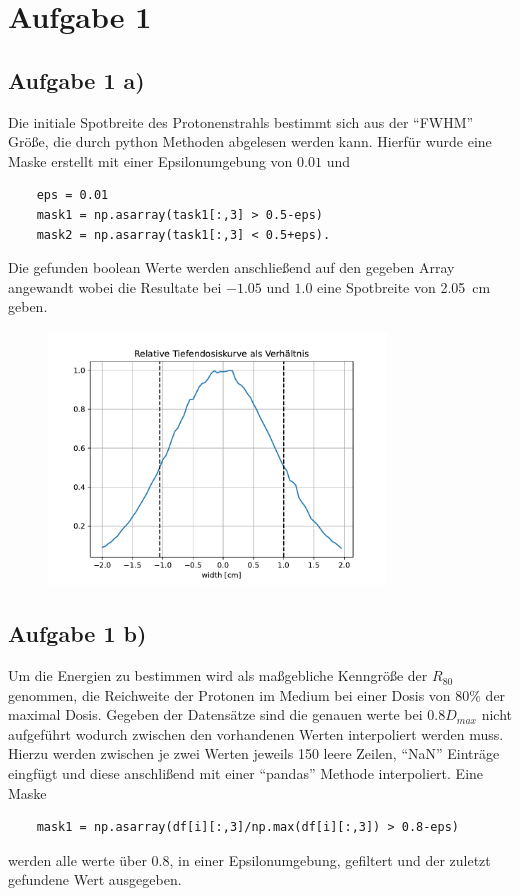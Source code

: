\section{Aufgabe 1}
\subsection{Aufgabe 1 a)}
Die initiale Spotbreite des Protonenstrahls bestimmt sich aus der \enquote{FWHM} Größe, die durch python Methoden abgelesen werden kann.
Hierfür wurde eine Maske erstellt mit einer Epsilonumgebung von $0.01$ und
\begin{verbatim}
    eps = 0.01
    mask1 = np.asarray(task1[:,3] > 0.5-eps)
    mask2 = np.asarray(task1[:,3] < 0.5+eps).
\end{verbatim}
Die gefunden boolean Werte werden anschließend auf den gegeben Array angewandt wobei die Resultate bei $-1.05$ und $1.0$ eine Spotbreite von \SI{2.05}{\cm} geben.
\begin{figure}
    \includegraphics[width = 0.8\textwidth]{../poject/task1/task1a.pdf}
\end{figure}
\noindent
\subsection{Aufgabe 1 b)}
Um die Energien zu bestimmen wird als maßgebliche Kenngröße der $R_{80}$ genommen, die Reichweite der Protonen 
im Medium bei einer Dosis von $80\%$ der maximal Dosis. Gegeben der Datensätze sind die genauen werte bei $0.8 D_{max}$ nicht aufgeführt wodurch zwischen den 
vorhandenen Werten interpoliert werden muss. Hierzu werden zwischen je zwei Werten jeweils 150 leere Zeilen, \enquote{NaN} Einträge eingfügt und diese anschlißend mit einer 
\enquote{pandas} Methode interpoliert. Eine Maske
\begin{verbatim}
    mask1 = np.asarray(df[i][:,3]/np.max(df[i][:,3]) > 0.8-eps)
\end{verbatim}
werden alle werte über 0.8, in einer Epsilonumgebung, gefiltert und der zuletzt gefundene Wert ausgegeben. 

